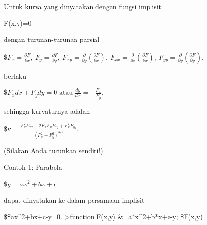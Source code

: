 \documentclass[
]{book}
\begin{document}
Untuk kurva yang dinyatakan dengan fungsi implisit

F(x,y)=0

dengan turunan-turunan parsial

\$\(F_x=\frac{\partial F}{\partial x},\ F_y=\frac{\partial F}{\partial y},\ F_{xy}=\frac{\partial}{\partial y}\left(\frac{\partial F}{\partial x}\right),\ F_{xx}=\frac{\partial}{\partial x}\left(\frac{\partial F}{\partial x}\right),\ F_{yy}=\frac{\partial}{\partial y}\left(\frac{\partial F}{\partial y}\right),\)

berlaku

\$\(F_x dx+ F_y dy = 0\text{ atau } \frac{dy}{dx}=-\frac{F_x}{F_y},\)

sehingga kurvaturnya adalah

\$\(\kappa =\frac {F_y^2F_{xx}-2F_xF_yF_{xy}+F_x^2F_{yy}}{\left(F_x^2+F_y^2\right)^{3/2}}.\)

(Silakan Anda turunkan sendiri!)

Contoh 1: Parabola

\$\(y=ax^2+bx+c\)

dapat dinyatakan ke dalam persamaan implisit

\$\$ax\^{}2+bx+c-y=0. \textgreater function F(x,y) \&=a*x\^{}2+b*x+c-y; \$F(x,y)
\end{document}
